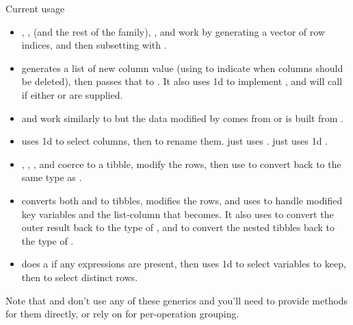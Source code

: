 \documentclass[a4paper]{book}
\begin{document}
\begin{Section}{Current usage}
\begin{itemize}

\item{} , ,  (and the rest of the 
family), , and  work by generating a vector of
row indices, and then subsetting with .
\item{}  generates a list of new column value (using  to indicate
when columns should be deleted), then passes that to .
It also uses 1d \code{[} to implement , and will call  if
either  or  are supplied.
\item{}  and  work similarly to  but the data
modified by  comes from  or is built
from .
\item{}  uses 1d \code{[} to select columns, then  to rename them.
 just uses .  just uses 1d \code{[}.
\item{} , , , and 
coerce  to a tibble, modify the rows, then use 
to convert back to the same type as .
\item{}  converts both  and  to tibbles, modifies the rows,
and uses  to handle modified key variables and the
list-column that  becomes. It also uses  to convert
the outer result back to the type of , and to convert the nested tibbles
back to the type of .
\item{}  does a  if any expressions are present, then
uses 1d \code{[} to select variables to keep, then  to
select distinct rows.

\end{itemize}


Note that  and  don't use any of these generics and
you'll need to provide methods for them directly, or rely on  for
per-operation grouping.
\end{Section}
\end{document}
